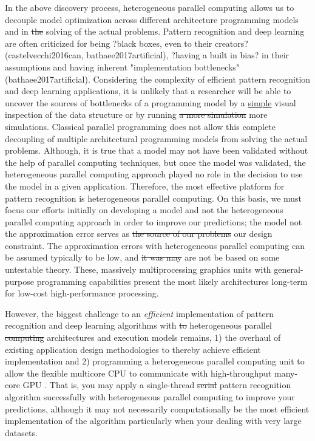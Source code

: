 \documentclass[10pt]{article}[draft]
\begin{document}
In the above discovery process, heterogeneous parallel computing allows us to decouple model optimization across different architecture programming models and  in \st{the} solving of the actual problems. Pattern recognition and deep learning are often criticized for being  ?black boxes, even to their creators? (castelvecchi2016can, bathaee2017artificial), ?having a built in bias? in their assumptions and having inherent "implementation bottlenecks" (bathaee2017artificial). Considering the complexity of efficient pattern recognition and deep learning applications, it is unlikely that a researcher will be able to uncover the sources of bottlenecks of a programming model by a \underline{simple} visual inspection of the data structure  or by running \st{a more simulation} more simulations. Classical parallel programming does not allow this complete decoupling of multiple architectural programming models from  solving the actual problems. Although, it is true that a model may not have been validated without the help of parallel computing techniques, but once the model was validated, the heterogeneous parallel computing approach  played no role in the decision to use the model in a given application. Therefore, the most effective platform for pattern recognition is  heterogeneous parallel computing. On this basis, we must focus our efforts initially on developing a model and not the heterogeneous parallel computing approach in order to improve our  predictions; the model not the approximation error  serves as \st{the source of our problems } our design constraint. The approximation errors with heterogeneous parallel computing can be assumed typically to be low, and \st{it was may} are not be based on some untestable theory. These, massively multiprocessing graphics units with general-purpose programming capabilities present the most likely architectures long-term for low-cost high-performance processing. 

However, the biggest challenge to an \emph{efficient} implementation of pattern recognition and deep learning algorithms with \st{to} heterogeneous parallel \st{computing} architectures and execution models remains, 1) the overhaul of existing application design methodologies to thereby achieve  efficient implementation and 2) programming a heterogeneous parallel computing unit to allow the flexible multicore CPU to communicate with high-throughput many-core GPU . That is, you may apply a single-thread \st{serial} pattern recognition algorithm successfully with  heterogeneous parallel computing to improve your predictions, although it may not {necessarily} computationally be the most efficient implementation  of the algorithm particularly when your dealing with very large datasets. 
\end{document}
